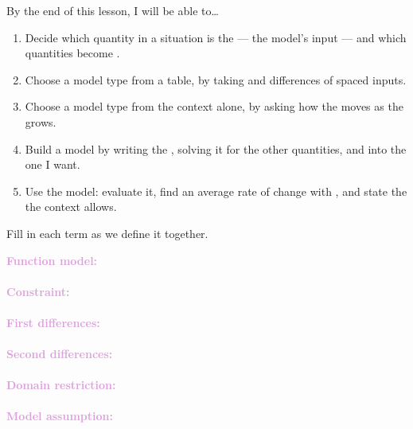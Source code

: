 \documentclass[10pt]{article}
\begin{document}

\vspace{0.12in}

\begin{objectivebox}
By the end of this lesson, I will be able to\ldots
\begin{enumerate}[itemsep=2pt]
  \item Decide which quantity in a situation is the  --- the
        model's input --- and which quantities become .
  \item Choose a model type from a table, by taking  and
         differences of  spaced inputs.
  \item Choose a model type from the context alone, by asking how the
         moves as the  grows.
  \item Build a model by writing the , solving it for the other
        quantities, and  into the one I want.
  \item Use the model: evaluate it, find an average rate of change with
        , and state the  the context allows.
\end{enumerate}
\end{objectivebox}

\vspace{0.1in}

\boxguard
\begin{vocabbox}
Fill in each term as we define it together.
\par\vspace{2pt}
\noindent\textbf{\textcolor{plum}{Function model:}}\\[1pt]
\\[3pt]
\noindent\textbf{\textcolor{plum}{Constraint:}}\\[1pt]
\\[3pt]
\noindent\textbf{\textcolor{plum}{First differences:}}\\[1pt]
\\[3pt]
\noindent\textbf{\textcolor{plum}{Second differences:}}\\[1pt]
\\[3pt]
\noindent\textbf{\textcolor{plum}{Domain restriction:}}\\[1pt]
\\[3pt]
\noindent\textbf{\textcolor{plum}{Model assumption:}}\\[1pt]
\end{vocabbox}
\end{document}
